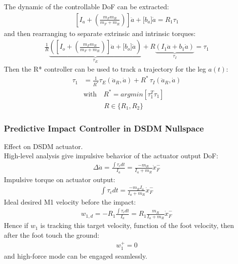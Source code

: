 The dynamic of the controllable DoF can be extracted:
\begin{align}
\left[ I_a + \left( \frac{m_F m_R}{m_F + m_R} \right) \right] \ddot{a} + \Bigg[ b_a \Bigg] \dot{a} = R_1 \tau_1
\end{align}
%
and then rearranging to separate extrinsic and intrinsic torques:
%
\begin{align} 
\frac{1}{R}
\underbrace{\left(
\left[ I_o + \left( \frac{m_F m_R}{m_F + m_R} \right) \right] \ddot{a} + \Bigg[ b_o \Bigg] \dot{a}
\right)}_{\tau_E}
+ R
\underbrace{\left(
 I_1 \ddot{a} + b_1 \dot{a}
\right)}_{\tau_I}
= \tau_1
\end{align}
%
Then the R* controller can be used to track a trajectory for the leg $a(t)$:
%
\begin{align} 
\tau_1 &= \frac{1}{R^*} \tau_E( \ddot{a}_R , \dot{a} ) + R^* \, \tau_I( \ddot{a}_R , \dot{a} ) \\ 
& \text{with} \quad R^* = argmin\left[ \tau_1^T \tau_1\right] \\
& \quad \quad \quad R \in \{R_1, R_2\}
\end{align}
%



\subsubsection{Predictive Impact Controller in DSDM Nullspace}


Effect on DSDM actuator.\\
High-level analysis give impulsive behavior of the actuator output DoF:
%
\begin{align}
\Delta \dot{a} = \frac{ \int{\tau_c dt} }{ I_a }  = \frac{-m_R}{I_a + m_R} \dot{x}_F^-
\end{align}
%
Impulsive torque on actuator output:
%
\begin{align}
\int{\tau_c dt} = \frac{-m_R I_a}{I_a + m_R} \dot{x}_F^-
\end{align}
%
Ideal desired M1 velocity before the impact:
\begin{align}
w_{1,d}  = - R_1 \frac{\int{\tau_c dt}}{I_a} =  R_1 \frac{m_R}{I_a + m_R} \dot{x}_F^-
\end{align}
%
Hence if $w_1$ is tracking this target velocity, function of the foot velocity, then after the foot touch the ground:
\begin{align}
w_{1}^+  = 0
\end{align}
and high-force mode can be engaged seamlessly.


